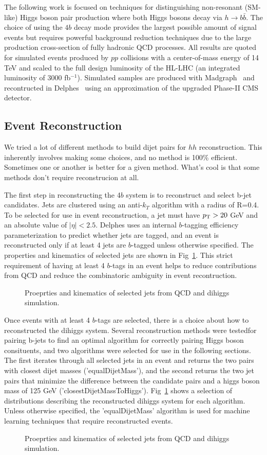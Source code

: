 The following work is focused on techniques for distinguishing non-resonant (SM-like) Higgs boson pair production where both Higgs bosons decay via $h \to b \bar{b}$. The choice of using the $4b$ decay mode provides the largest possible amount of signal events but requires powerful background reduction techniques due to the large production cross-section of fully hadronic QCD processes. All results are quoted for simulated events produced by $pp$ collisions with a center-of-mass energy of 14 TeV and scaled to the full design luminosity of the HL-LHC (an integrated luminosity of 3000 fb$^{-1}$). Simulated samples are produced with Madgraph~\cite{Alwall:2014hca} and recontructed in Delphes~\cite{de_Favereau_2014} using an approximation of the upgraded Phase-II CMS detector.

\subsection{Event Reconstruction}
We tried a lot of different methods to build dijet pairs for $hh$ reconstruction. This inherently involves making some choices, and no method is 100\% efficient. Sometimes one or another is better for a given method. What's cool is that some methods don't require reconstrucion at all.

The first step in reconstructing the 4$b$ system is to reconstruct and select b-jet candidates. Jets are clustered using an anti-$k_T$ algorithm with a radius of R=0.4. To be selected for use in event reconstruction, a jet must have $p_{\text{T}} > 20$ GeV and an absolute value of $\mid\eta\mid < 2.5$. Delphes uses an internal $b$-tagging efficiency parameterization to predict whether jets are tagged, and an event is reconstructed only if at least 4 jets are $b$-tagged unless otherwise specified. The properties and kinematics of selected jets are shown in Fig~\ref{fig:jetInfo}. This strict requirement of having at least 4 $b$-tags in an event helps to reduce contributions from QCD and reduce the combinatoric ambiguity in event recontruction.

\begin{figure}
  \caption{Proeprties and kinematics of selected jets from QCD and dihiggs simulation.}
  \label{fig:jetInfo}
\end{figure}

Once events with at least 4 $b$-tags are selected, there is a choice about how to reconstructed the dihiggs system. Several reconstruction methods were testedfor pairing b-jets to find an optimal algorithm for correctly pairing Higgs boson consituents, and two algorithms were selected for use in the following sections. The first iterates through all selected jets in an event and returns the two pairs with closest dijet masses ('equalDijetMass'), and the second returns the two jet pairs that minimize the difference between the candidate pairs and a higgs boson mass of 125 GeV ('closestDijetMassToHiggs'). Fig~\ref{fig:jetInfo} shows a selection of distributions describing the reconstructed dihiggs system for each algorithm. Unless otherwise specified, the 'equalDijetMass' algorithm is used for machine learning techniques that require reconstructed events.

\begin{figure}
  \caption{Proeprties and kinematics of selected jets from QCD and dihiggs simulation.}
  \label{fig:eventQuantities}
\end{figure}

